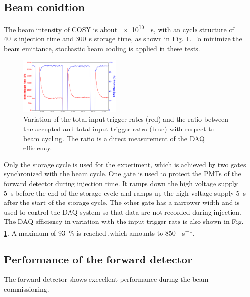 \documentclass[number,5p]{elsarticle}
\begin{document}
\subsection{Beam conidtion}
\label{beam}
The beam intensity of COSY is about \SI[per-mode=reciprocal]{e10}{\per\second}, with an cycle structure of
\SI{40}{\second} injection time and \SI{300}{\second} storage time, as shown in Fig. \ref{fig:beam}.
To minimize the beam emittance, stochastic beam cooling is applied in these tests.
\begin{figure}[h]
  \centering
  \includegraphics[width=0.45\textwidth]{./daq_efficiency.png}
  \caption{Variation of the total input trigger rates (red) and the ratio between the accepted
    and total input trigger rates (blue) with respect to beam cycling. The ratio
    is a direct measurement of the DAQ efficiency.}
  \label{fig:beam}
\end{figure}

Only the storage cycle is used for the experiment, which is achieved by two
gates synchronized with the beam cycle.
One gate is used to protect the PMTs of the forward detector during injection
time.
It ramps down the high voltage supply \SI{5}{\second} before the end of the
storage cycle and ramps up the high voltage supply \SI{5}{\second} after the start of the storage cycle.
The other gate has a narrower width and is used to control the DAQ system so that data are not recorded during injection.
The DAQ efficiency in variation with the input trigger rate is also shown in Fig. \ref{fig:beam}.
A maximum of \SI{93}{\percent} is reached ,which amounts to \SI{850}{\event\per\second}.

\subsection{Performance of the forward detector}
\label{fwd_performance}

The forward detector shows execellent performance during the beam commissioning.
\end{document}
